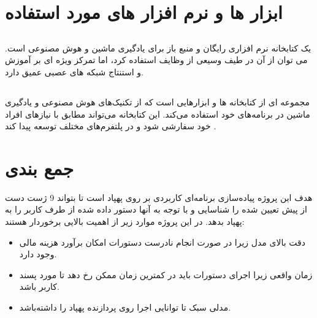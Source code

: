  
\section{ابزار ها و نرم افزار های مورد استفاده}
\subsection{}
 یک کتابخانه نرم افزاری رایگان و منبع باز برای یادگیری ماشین و هوش مصنوعی است. می توان از آن در طیف وسیعی از وظایف استفاده کرد، اما تمرکز ویژه ای بر آموزش و استنتاج شبکه های عصبی عمیق دارد.

\subsection{}
 مجموعه ای از کتابخانه ها و ابزارهایی است که از تکنیک‌های هوش مصنوعی و یادگیری ماشین در برنامه‌های خود استفاده می‌کند. این کتابخانه می‌تواند مطابق با نیازهای افراد خود سفارشی شود و در پلتفرم‌های مختلف توسعه پیدا کند \cite{harris2021applying}.


\section{جمع بندی}
 هدف این پروژه پیاده‌سازی برنامه‌ای کاربردی بر روی پهپاد است تا بتواند 9 ژست دست از پیش تعیین شده را شناسایی و با توجه به آنها دستور داده شده از طرف کاربر را به پهپاد بدهد.
 در این پروژه موارد زیر از اهمیت بالایی برخوردار هستند:
 \begin{itemize}
    \item دقت بالای مدل زیرا در صورت انجام نادرست دستورات امکان برآورد هزینه مالی وجود دارد.
    \item زمان واقعی زیرا اجرای دستورات باید در کمترین زمان ممکن رخ دهد تا مورد پسند کاربر باشد.
    \item مدلی سبک تا توانایی اجرا روی پردازنده پهپاد را داشته‌باشد.
\end{itemize}


